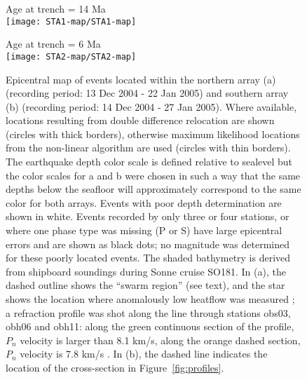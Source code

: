 \documentclass[reviewcopy]{elsart}
\renewcommand{\includegraphics}[2][]{\fbox{#2}}
\begin{document}
\begin{figure}
\begin{minipage}[t]{0.49\textwidth}
{ Age at trench = 14 Ma} \\
\texttt{[image: STA1-map/STA1-map]}
\end{minipage}\hfill%
\begin{minipage}[t]{0.49\textwidth}
{  Age at trench = 6 Ma} \\
\texttt{[image: STA2-map/STA2-map]}
\end{minipage}

\caption{Epicentral map of events located within the northern array
  (a) (recording period: 13 Dec 2004 - 22 Jan 2005) and southern array
  (b)  (recording period: 14 Dec 2004 - 27 Jan 2005). Where available, locations resulting
  from double difference relocation are shown (circles with thick
  borders), otherwise maximum likelihood locations from the non-linear
   algorithm are used (circles with thin borders).  
  The earthquake depth color scale is defined relative to sealevel but
  the color scales for a and b were chosen in such a way that the same depths
  below the seafloor will approximately correspond to the same color
  for both arrays.    Events
  with poor depth determination are shown in white. Events recorded by
  only three or four stations, or where one phase type was missing (P
  or S) have large epicentral errors and are shown as black dots; no
  magnitude was determined for these poorly located events.
  The shaded bathymetry is derived from shipboard
soundings during Sonne cruise SO181. 
In (a), the dashed outline shows the ``swarm
region'' (see text), and the star shows the location where anomalously
low heatflow was measured \citep{contreras-reyes07}; a refraction profile was shot along the line through stations obs03, obh06 and
obh11: along the green continuous section of the profile, $P_n$ velocity is larger than
8.1 km/s, along the orange dashed section, $P_n$ velocity is 7.8 km/s
\citep{contreras-reyes07}. In (b), the dashed line indicates the location of the
cross-section in Figure~\protect\ref{fig:profiles}.}
\label{fig:epimaps}
\end{figure}
\end{document}
